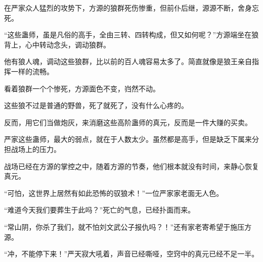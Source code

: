 \begin{this_body}
在严家众人猛烈的攻势下，方源的狼群死伤惨重，但前仆后继，源源不断，舍身忘死。

“这些蛊师，虽是凡俗的高手，全由三转、四转构成，但又如何呢？”方源端坐在狼背上，心中转动念头，调动狼群。

他有狼人魂，调动这些狼群，比以前的百人魂容易太多了。简直就像是狼王亲自指挥一样的流畅。

看着狼群一个个惨死，方源面色不变，岿然不动。

这些狼不过是普通的野兽，死了就死了，没有什么心疼的。

反而，用它们当做炮灰，来消磨这些高阶蛊师的真元，反而是一件大赚的买卖。

严家这些蛊师，最大的弱点，就在于人数太少。虽然都是高手，但是缺乏下属来分担战场上的压力。

战场已经在方源的掌控之中，随着方源的节奏，他们根本就没有时间，来静心恢复真元。

“可怕，这世界上居然有如此恐怖的驭狼术！”一位严家家老面无人色。

“难道今天我们要葬生于此吗？”死亡的气息，已经扑面而来。

“常山阴，你杀了我们，就不怕刘文武公子报仇吗？！”还有家老寄希望于施压方源。

“冲，不能停下来！”严天寂大吼着，声音已经嘶哑，空窍中的真元已经不足一半。

\end{this_body}

